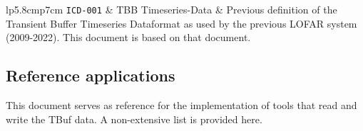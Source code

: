 \documentclass[a4paper,10pt,bibtotoc]{scrartcl}
\begin{document}
\begin{center}
  \tablelasttail{\hline}
  \begin{supertabular}{lp{5.8cm}p{7cm}}
    \shrinkheight{-4.5em}
    \texttt{ICD-001} \cite{lofar.icd.001} & TBB Timeseries-Data & Previous definition of the Transient Buffer Timeseries Dataformat as used by the previous LOFAR system (2009-2022). This document is based on that document. \\
    \hline
  \end{supertabular}
\end{center}


\subsection{Reference applications}
This document serves as reference for the
implementation of tools that read and write the TBuf data. A non-extensive list is provided here.

\end{document}
